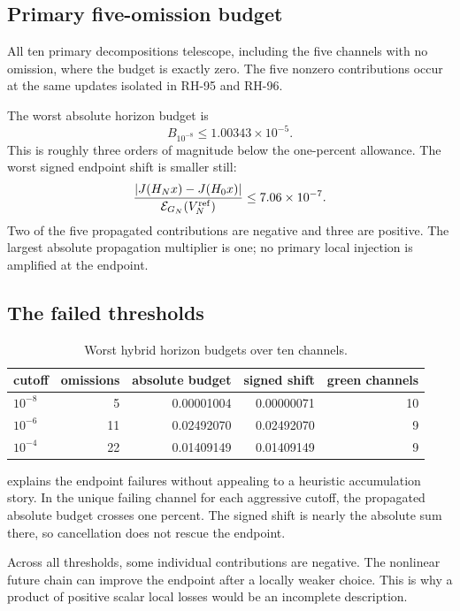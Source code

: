 \documentclass[11pt]{article}
\theoremstyle{definition}
\theoremstyle{remark}
\begin{document}
\subsection{Primary five-omission budget}

All ten primary decompositions telescope, including the five channels with no
omission, where the budget is exactly zero.  The five nonzero contributions
occur at the same updates isolated in RH-95 and RH-96.

The worst absolute horizon budget is
\[
 B_{10^{-8}}\le1.00343\times10^{-5}.
\]
This is roughly three orders of magnitude below the one-percent allowance.
The worst signed endpoint shift is smaller still:
\[
 \frac{|J(H_Nx)-J(H_0x)|}{\mathcal E_{G_N}(V_N^{\rm ref})}
 \le7.06\times10^{-7}.
\]
Two of the five propagated contributions are negative and three are positive.
The largest absolute propagation multiplier is one; no primary local
injection is amplified at the endpoint.

\subsection{The failed thresholds}

\begin{table}[t]
\centering
\caption{Worst hybrid horizon budgets over ten channels.}
\label{tab:budgets}
\begin{tabular}{@{}lrrrr@{}}
\toprule
cutoff & omissions & absolute budget & signed shift & green channels\\
\midrule
$10^{-8}$ & 5  & 0.00001004 & 0.00000071 & 10\\
$10^{-6}$ & 11 & 0.02492070 & 0.02492070 & 9\\
$10^{-4}$ & 22 & 0.01409149 & 0.01409149 & 9\\
\bottomrule
\end{tabular}
\end{table}

 explains the endpoint failures without appealing to a
heuristic accumulation story.  In the unique failing channel for each
aggressive cutoff, the propagated absolute budget crosses one percent.  The
signed shift is nearly the absolute sum there, so cancellation does not rescue
the endpoint.

Across all thresholds, some individual contributions are negative.  The
nonlinear future chain can improve the endpoint after a locally weaker choice.
This is why a product of positive scalar local losses would be an incomplete
description.
\end{document}
